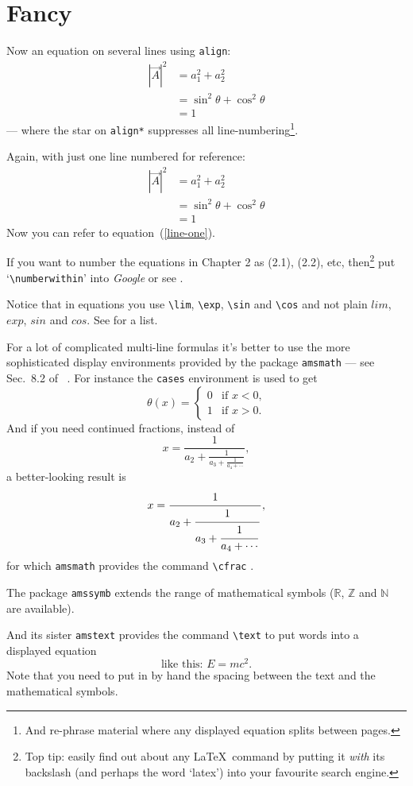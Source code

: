 \section{Fancy}
Now an equation on several lines using \verb+align+:
\begin{align*}
  |\vec A|^2 &= a_1^2+a_2^2  \\
             &= \sin^2\theta+\cos^2\theta \\
             &= 1
\end{align*}--- where the star on \verb+align*+ suppresses
all line-numbering\footnote{And re-phrase material where any displayed
equation splits between pages.}.
\par
Again, with just one line numbered for reference:
\begin{equation}
\begin{aligned}
  |\vec A|^2 &= a_1^2+a_2^2  \label{line-one}\\
             &= \sin^2\theta+\cos^2\theta \\
             &= 1 
\end{aligned}
\end{equation}
Now you can refer to equation~(\ref{line-one}).
\par
If you want to number the equations in Chapter 2 as (2.1), (2.2), etc,
then\footnote{Top tip: easily find out about any \LaTeX\ command by
putting it \textit{with} its backslash (and perhaps the word \lq latex')
into your favourite search engine.} put \lq\verb+\numberwithin+' into
\textsl{Google} or see \cite[Sec 8.2.14]{MG}.
\par
Notice that in equations you use \verb+\lim+, \verb+\exp+, \verb+\sin+
and \verb+\cos+ and not plain $lim$, $exp$, $sin$ and $cos$. See
\cite[Sec.~3.3]{NSS} for a list.
\par
For a lot of complicated multi-line formulas it's better to use the more
sophisticated display environments provided by the package
\texttt{amsmath} --- see Sec.~8.2 of \comp\ \cite{MG}.
For instance the \texttt{cases} environment is used to get
\[\theta(x)=\begin{cases}0&\text{if $x<0$,}\\
		1&\text{if $x>0$.}\end{cases}\]
And if you need continued fractions, instead of 
\[x=\frac{1}{a_2+\frac{1}{a_3+\frac{1}{a_4+\cdots}}},\]a better-looking
result
is\[x=\frac{\strut1}{\displaystyle a_2+\frac{\strut1}{\displaystyle
a_3+\frac{\strut1}{\displaystyle a_4+\cdots}}},\]for which
\texttt{amsmath}
provides the command \verb+\cfrac+ \cite[Sec.~8.4.2]{MG}.
\par
The package \texttt{amssymb} \cite[Chap.~8]{MG} extends the range of
mathematical symbols (\eg\(\mathbb{R}\), \(\mathbb{Z}\) and
\(\mathbb{N}\) are available).
\par
And its sister \texttt{amstext} provides the command \verb+\text+ to
put words into a displayed equation \[ \text{like this: }E=mc^2. \]Note
that you need to put in by hand the spacing between the text and the
mathematical symbols.
%
